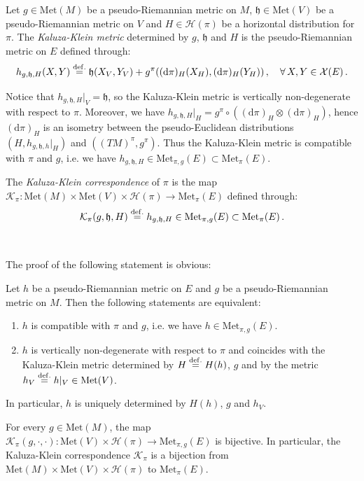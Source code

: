 \documentclass[10pt, cmp, numbook, final, a4paper]{svjour}
\newcommand{\eqdef}{\stackrel{{\rm def.}}{=}}
\def\dd{\mathrm{d}}
\newcommand{\be}{\begin{equation*}}
\newcommand{\ee}{\end{equation*}}
\newcommand{\ben}{\begin{equation}}
\newcommand{\een}{\end{equation}}
\def\cX{\mathcal{X}}
\def\cH{\mathcal{H}}
\def\cX{\mathcal{X}}
\def\Met{\mathrm{Met}}
\def\fh{\mathfrak{h}}
\begin{document}
\begin{definition}
Let $g\in \Met(M)$ be a pseudo-Riemannian metric on $M$,
$\fh\in \Met(V)$ be a pseudo-Riemannian metric on $V$ and
$H\in \cH(\pi)$ be a horizontal distribution for $\pi$. The {\em
Kaluza-Klein metric} determined by $g$, $\fh$ and $H$ is the
pseudo-Riemannian metric on $E$ defined through:
\ben
\label{KK}
h_{g, \fh, H}(X,Y)\eqdef \fh(X_V,Y_V)+g^\pi( (\dd \pi)_H
(X_H),(\dd \pi)_H(Y_H))\, , \quad \forall\, X,Y\in \cX(E)\, .
\een
\end{definition}


\noindent 
Notice that $h_{g,\fh,H}|_{V}=\fh$, so the Kaluza-Klein metric is
vertically non-degenerate with respect to $\pi$. Moreover, we have
$h_{g,\fh,H}|_H=g^\pi\circ ((\dd\pi)_H\otimes (\dd\pi)_H)$, hence
$(\dd \pi)_H$ is an isometry between the pseudo-Euclidean
distributions $(H, h_{g,\fh,h}|_H)$ and $((TM)^\pi, g^\pi)$. Thus the
Kaluza-Klein metric is compatible with $\pi$ and $g$, i.e. we have
$h_{g,\fh,H}\in \Met_{\pi,g}(E)\subset \Met_\pi(E)$.

\begin{definition}
The {\em Kaluza-Klein correspondence} of $\pi$ is the map
$\mathcal{K}_\pi:\Met(M)\times \Met(V)\times\cH(\pi)\rightarrow
\Met_\pi(E)$ defined through:
\be
\mathcal{K}_\pi(g,\fh,H)\eqdef h_{g,\fh,H}\in \Met_{\pi,g}(E)\subset \Met_\pi(E)\, .
\ee
\end{definition}

\

\noindent
The proof of the following statement is obvious:

\begin{proposition}
Let $h$ be a pseudo-Riemannian metric on $E$ and $g$ be a
pseudo-Riemannian metric on $M$. Then the following statements are
equivalent:
\begin{enumerate}[1.]
\item $h$ is compatible with $\pi$ and $g$, i.e. we have $h\in
  \Met_{\pi,g}(E)$.
\item $h$ is vertically non-degenerate with respect to $\pi$ and
  coincides with the Kaluza-Klein metric determined by $H\eqdef H(h)$,
  $g$ and by the metric $h_V\eqdef h|_{V}\in \Met(V)$.
\end{enumerate}
In particular, $h$ is uniquely determined by $H(h)$, $g$ and $h_V$.
\end{proposition}

\begin{corollary}
For every $g\in \Met(M)$, the map $\mathcal{K}_\pi(g,\cdot,
\cdot):\Met(V)\times \cH(\pi)\rightarrow \Met_{\pi,g}(E)$ is
bijective. In particular, the Kaluza-Klein correspondence
$\mathcal{K}_\pi$ is a bijection from $\Met(M)\times\Met(V)\times
\cH(\pi)$ to $\Met_\pi(E)$.
\end{corollary}
\end{document}
